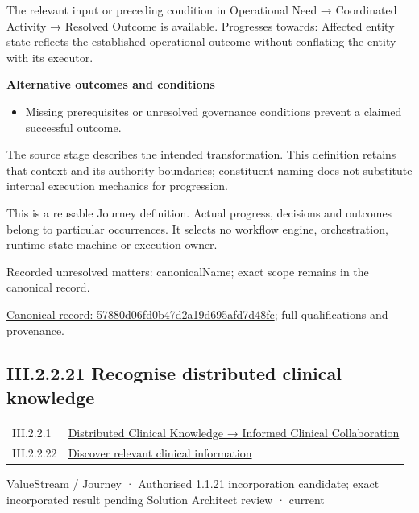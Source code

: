 The relevant input or preceding condition in Operational Need → Coordinated Activity → Resolved Outcome is available. Progresses towards: Affected entity state reflects the established operational outcome without conflating the entity with its executor.



\par\medskip\textbf{Alternative outcomes and conditions}\par


\begin{itemize}


\item Missing prerequisites or unresolved governance conditions prevent a claimed successful outcome.

\end{itemize}


The source stage describes the intended transformation. This definition retains that context and its authority boundaries; constituent naming does not substitute internal execution mechanics for progression.



This is a reusable Journey definition. Actual progress, decisions and outcomes belong to particular occurrences. It selects no workflow engine, orchestration, runtime state machine or execution owner.


{\small Recorded unresolved matters: canonicalName; exact scope remains in the canonical record.}\par
{\footnotesize \href{../../../../../../../continuum/strategy/value-stream/57880d06fd0b47d2a19d695afd7d48fc.md}{Canonical record: 57880d06fd0b47d2a19d695afd7d48fc}; full qualifications and provenance.}\par
\subsection*{III.2.2.21 Recognise distributed clinical knowledge}
\label{navigation:III.2.2.21}

\begin{longtable}{p{.22\linewidth}p{.73\linewidth}}
III.2.2.1 & \hyperref[element:3ba98c0c1170458f8c02fa76694fee67]{Distributed Clinical Knowledge → Informed Clinical Collaboration} \\
III.2.2.22 & \hyperref[element:413213f085b44715a309f39b55ee3ee6]{Discover relevant clinical information} \\
\end{longtable}
\label{element:fc1b52968e944710b41b2a7c3fa53e5b}
{\small ValueStream / Journey · Authorised 1.1.21 incorporation candidate; exact incorporated result pending Solution Architect review · current}\par

